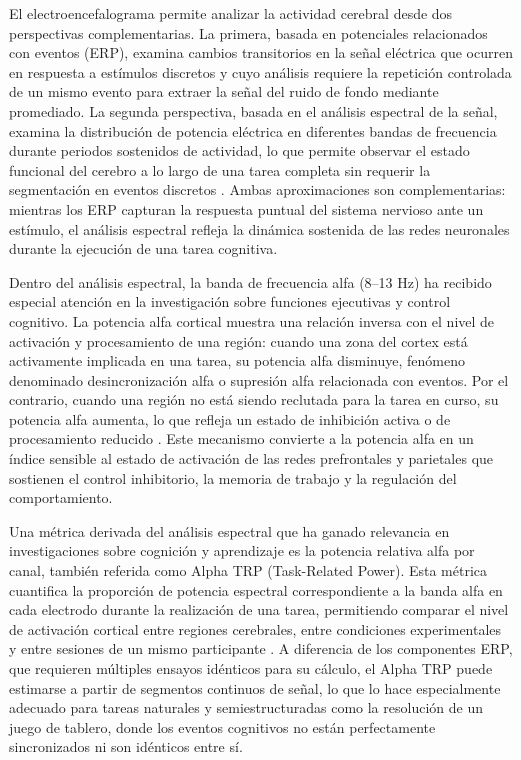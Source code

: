 \documentclass{book}
\begin{document}
El electroencefalograma permite analizar la actividad cerebral 
desde dos perspectivas complementarias. La primera, basada en 
potenciales relacionados con eventos (ERP), examina cambios 
transitorios en la señal eléctrica que ocurren en respuesta a 
estímulos discretos y cuyo análisis requiere la repetición 
controlada de un mismo evento para extraer la señal del ruido 
de fondo mediante promediado. La segunda perspectiva, basada 
en el análisis espectral de la señal, examina la distribución 
de potencia eléctrica en diferentes bandas de frecuencia 
durante periodos sostenidos de actividad, lo que permite 
observar el estado funcional del cerebro a lo largo de una 
tarea completa sin requerir la segmentación en eventos 
discretos \cite{Luck2014, Uhlhaas2006}. Ambas aproximaciones 
son complementarias: mientras los ERP capturan la respuesta 
puntual del sistema nervioso ante un estímulo, el análisis 
espectral refleja la dinámica sostenida de las redes neuronales 
durante la ejecución de una tarea cognitiva.

Dentro del análisis espectral, la banda de frecuencia alfa 
(8--13 Hz) ha recibido especial atención en la investigación 
sobre funciones ejecutivas y control cognitivo. La potencia 
alfa cortical muestra una relación inversa con el nivel de 
activación y procesamiento de una región: cuando una zona del 
cortex está activamente implicada en una tarea, su potencia 
alfa disminuye, fenómeno denominado desincronización alfa o 
supresión alfa relacionada con eventos. Por el contrario, 
cuando una región no está siendo reclutada para la tarea en 
curso, su potencia alfa aumenta, lo que refleja un estado 
de inhibición activa o de procesamiento reducido 
\cite{Klimesch1999, Pfurtscheller1999}. Este mecanismo 
convierte a la potencia alfa en un índice sensible al estado 
de activación de las redes prefrontales y parietales que 
sostienen el control inhibitorio, la memoria de trabajo y 
la regulación del comportamiento.

Una métrica derivada del análisis espectral que ha ganado 
relevancia en investigaciones sobre cognición y aprendizaje 
es la potencia relativa alfa por canal, también referida 
como Alpha TRP (Task-Related Power). Esta métrica cuantifica 
la proporción de potencia espectral correspondiente a la 
banda alfa en cada electrodo durante la realización de una 
tarea, permitiendo comparar el nivel de activación cortical 
entre regiones cerebrales, entre condiciones experimentales 
y entre sesiones de un mismo participante \cite{Klimesch1999}. 
A diferencia de los componentes ERP, que requieren múltiples 
ensayos idénticos para su cálculo, el Alpha TRP puede 
estimarse a partir de segmentos continuos de señal, lo que 
lo hace especialmente adecuado para tareas naturales y 
semiestructuradas como la resolución de un juego de tablero, 
donde los eventos cognitivos no están perfectamente 
sincronizados ni son idénticos entre sí.
\end{document}
